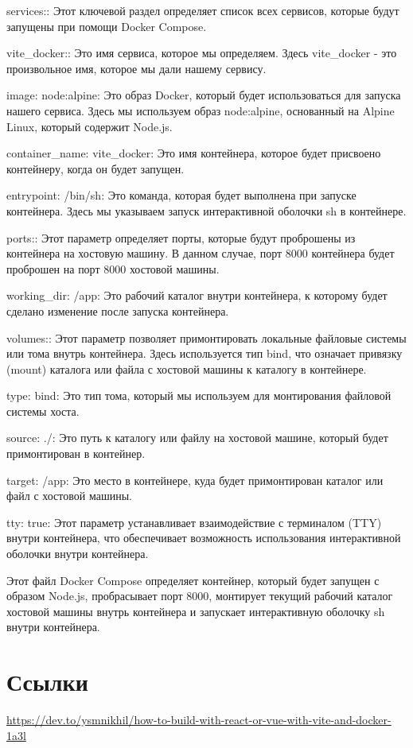 \documentclass[14pt, a4paper]{extarticle}
\begin{document}
services:: Этот ключевой раздел определяет список всех сервисов, которые будут запущены при помощи Docker Compose.

vite\_docker:: Это имя сервиса, которое мы определяем. Здесь vite\_docker - это произвольное имя, которое мы дали нашему сервису.

image: node:alpine: Это образ Docker, который будет использоваться для запуска нашего сервиса. Здесь мы используем образ node:alpine, основанный на Alpine Linux, который содержит Node.js.

container\_name: vite\_docker: Это имя контейнера, которое будет присвоено контейнеру, когда он будет запущен.

entrypoint: /bin/sh: Это команда, которая будет выполнена при запуске контейнера. Здесь мы указываем запуск интерактивной оболочки sh в контейнере.

ports:: Этот параметр определяет порты, которые будут проброшены из контейнера на хостовую машину. В данном случае, порт 8000 контейнера будет проброшен на порт 8000 хостовой машины.

working\_dir: /app: Это рабочий каталог внутри контейнера, к которому будет сделано изменение после запуска контейнера.

volumes:: Этот параметр позволяет примонтировать локальные файловые системы или тома внутрь контейнера. Здесь используется тип bind, что означает привязку (mount) каталога или файла с хостовой машины к каталогу в контейнере.

type: bind: Это тип тома, который мы используем для монтирования файловой системы хоста.

source: ./: Это путь к каталогу или файлу на хостовой машине, который будет примонтирован в контейнер.

target: /app: Это место в контейнере, куда будет примонтирован каталог или файл с хостовой машины.

tty: true: Этот параметр устанавливает взаимодействие с терминалом (TTY) внутри контейнера, что обеспечивает возможность использования интерактивной оболочки внутри контейнера.

Этот файл Docker Compose определяет контейнер, который будет запущен с образом Node.js, пробрасывает порт 8000, монтирует текущий рабочий каталог хостовой машины внутрь контейнера и запускает интерактивную оболочку sh внутри контейнера.

\section*{Ссылки}

\href{https://dev.to/ysmnikhil/how-to-build-with-react-or-vue-with-vite-and-docker-1a3l}{https://dev.to/ysmnikhil/how-to-build-with-react-or-vue-with-vite-and-docker-1a3l}
\end{document}
